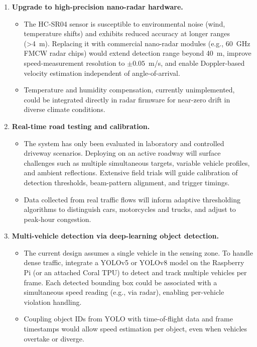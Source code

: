 \begin{enumerate}
  \item \textbf{Upgrade to high-precision nano-radar hardware.}
  \begin{itemize}
    \item The HC-SR04 sensor is susceptible to environmental noise (wind, temperature shifts) and exhibits reduced accuracy at longer ranges (>4~m). Replacing it with commercial nano-radar modules (e.g., 60~GHz FMCW radar chips) would extend detection range beyond 40~m, improve speed-measurement resolution to $\pm 0.05$~m/s, and enable Doppler-based velocity estimation independent of angle-of-arrival.
    \item Temperature and humidity compensation, currently unimplemented, could be integrated directly in radar firmware for near-zero drift in diverse climate conditions.
  \end{itemize}
  
  \item \textbf{Real-time road testing and calibration.}
  \begin{itemize}
    \item The system has only been evaluated in laboratory and controlled driveway scenarios. Deploying on an active roadway will surface challenges such as multiple simultaneous targets, variable vehicle profiles, and ambient reflections. Extensive field trials will guide calibration of detection thresholds, beam-pattern alignment, and trigger timings.
    \item Data collected from real traffic flows will inform adaptive thresholding algorithms to distinguish cars, motorcycles and trucks, and adjust to peak-hour congestion.
  \end{itemize}
  
  \item \textbf{Multi-vehicle detection via deep-learning object detection.}
  \begin{itemize}
    \item The current design assumes a single vehicle in the sensing zone. To handle dense traffic, integrate a YOLOv5 or YOLOv8 model on the Raspberry Pi (or an attached Coral TPU) to detect and track multiple vehicles per frame. Each detected bounding box could be associated with a simultaneous speed reading (e.g., via radar), enabling per-vehicle violation handling.
    \item Coupling object IDs from YOLO with time-of-flight data and frame timestamps would allow speed estimation per object, even when vehicles overtake or diverge.
  \end{itemize}
  

\end{enumerate}
